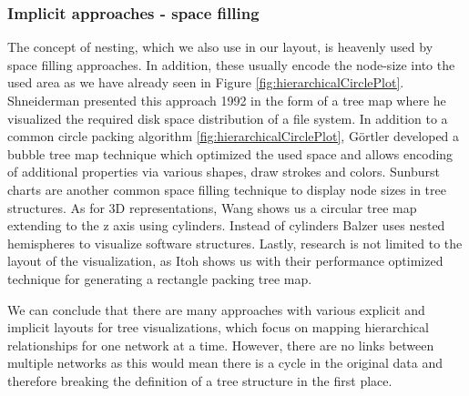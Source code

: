 \subsubsection{Implicit approaches - space filling}
The concept of nesting, which we also use in our layout, is heavenly used by space filling approaches. In addition, these usually encode the node-size into the used area as we have already seen in Figure \ref{fig:hierarchicalCirclePlot}.
Shneiderman \cite{shneiderman_tree_1992} presented this approach 1992 in the form of a tree map where he visualized the required disk space distribution of a file system. In addition to a common circle packing algorithm \ref{fig:hierarchicalCirclePlot}, Görtler \cite{gortler_bubble_2018} developed a bubble tree map technique which optimized the used space and allows encoding of additional properties via various shapes, draw strokes and colors. Sunburst charts are another common space filling technique to display node sizes in tree structures. 
As for 3D representations, Wang \cite{wang_visualization_2006} shows us a circular tree map extending to the z axis using cylinders. Instead of cylinders Balzer \cite{balzer_hierarchy_2004} uses nested hemispheres to visualize software structures.
Lastly, research is not limited to the layout of the visualization, as Itoh \cite{itoh_hierarchical_2004} shows us with their performance optimized technique for generating a rectangle packing tree map.

We can conclude that there are many approaches with various explicit and implicit layouts for tree visualizations, which focus on mapping hierarchical relationships for one network at a time. However, there are no links between multiple networks as this would mean there is a cycle in the original data and therefore breaking the definition of a tree structure in the first place. 

